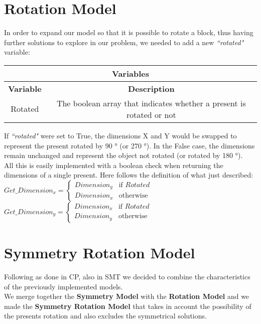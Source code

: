 



\section{Rotation Model}
In order to expand our model so that it is possible to rotate a block, thus having further solutions to explore in our problem, we needed to add a new \textit{``rotated"} variable:
\begin{center}
		\begin{tabular}{|c|c|}
			\hline
			\multicolumn{2}{|c|}{\textbf{Variables}} \\
			\hline
			\textbf{Variable} & {\textbf{Description}} \\
			\hline
			Rotated & The boolean array that indicates whether a present is rotated or not \\
			\hline
		\end{tabular}
\end{center}
If \textit{``rotated"} were set to True, the dimensions X and Y would be swapped to represent the present rotated by 90 ° (or 270 °). In the False case, the dimensions remain unchanged and represent the object not rotated (or rotated by 180 °). \\
All this is easily implemented with a boolean check when returning the dimensions of a single present.
Here follows the definition of what just described:\\
$
Get\_Dimension_x = 
\begin{cases}
	Dimension_y & \text{if } Rotated \\
	Dimension_x & \text{otherwise}
\end{cases}
$
\\
$
Get\_Dimension_y = 
\begin{cases}
	Dimension_x & \text{if } Rotated \\
	Dimension_y & \text{otherwise}
\end{cases}
$



\section{Symmetry Rotation Model}
Following as done in CP, also in SMT we decided to combine the characteristics of the previously implemented models.\\
We merge together the \textbf{Symmetry Model} with the \textbf{Rotation Model} and we made
the \textbf{Symmetry Rotation Model} that takes in account the possibility of the presents rotation and also excludes the symmetrical
solutions.

